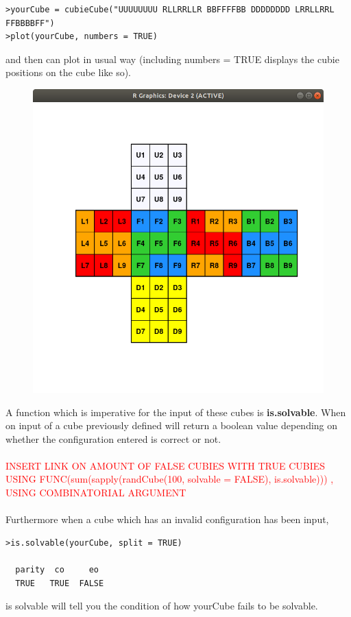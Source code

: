 \documentclass{article}
\begin{document}
\begin{lstlisting}
>yourCube = cubieCube("UUUUUUUU RLLRRLLR BBFFFFBB DDDDDDDD LRRLLRRL FFBBBBFF")
>plot(yourCube, numbers = TRUE)
\end{lstlisting}
and then can plot in usual way (including numbers = TRUE displays the cubie positions on the cube like so).
\begin{figure}[h]
	\centering
	\includegraphics[scale=.45]{labelledcube.png}
\end{figure}
A function which is imperative for the input of these cubes is \textbf{is.solvable}. When on input of a cube previously defined will return a boolean value depending on whether the configuration entered is correct or not.
\paragraph*{}
\textcolor{red}{INSERT LINK ON AMOUNT OF FALSE CUBIES WITH TRUE CUBIES USING FUNC(sum(sapply(randCube(100, solvable = FALSE), is.solvable))) , USING COMBINATORIAL ARGUMENT}
\paragraph*{}
Furthermore when a cube which has an invalid configuration has been input, 
\begin{lstlisting}
>is.solvable(yourCube, split = TRUE)

  parity  co     eo
  TRUE   TRUE  FALSE
\end{lstlisting}
is solvable will tell you the condition of how yourCube fails to be solvable.
\end{document}

